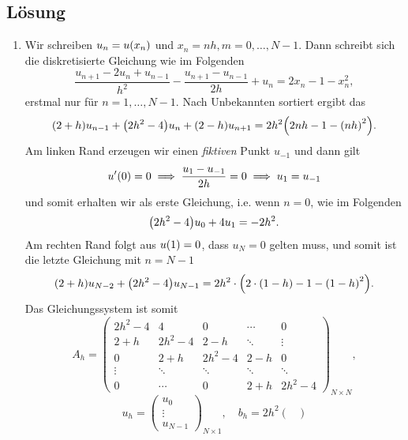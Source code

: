 \documentclass{exercise}
\begin{document}
    \subsection*{Lösung}
    \begin{enumerate}
        \item Wir schreiben \(u_n = u\parentheses*{x_n}\) und \(x_n = nh, m = 0, \ldots, N - 1\).
        Dann schreibt sich die diskretisierte Gleichung wie im Folgenden
        \[
            \frac{u_{n + 1} - 2u_n + u_{n - 1}}{h^2} - \frac{u_{n + 1} - u_{n - 1}}{2h} + u_n = 2x_n - 1 - x_n^2,
        \]
        erstmal nur für \(n = 1, \ldots, N - 1\).
        Nach Unbekannten sortiert ergibt das
        \[
            \parentheses*{2 + h}u_{n - 1} + \parentheses*{2h^2 - 4}u_n + \parentheses*{2 - h}u_{n + 1} = 2h^2 \parentheses*{2nh - 1 - \parentheses*{nh}^2}.
        \]
        Am linken Rand erzeugen wir einen \emph{fiktiven} Punkt \(u_{-1}\) und dann gilt
        \[
            u'\parentheses*{0} = 0 \implies \frac{u_1 - u_{-1}}{2h} = 0 \implies u_1 = u_{-1}
        \]
        und somit erhalten wir als erste Gleichung, i.e. wenn \(n = 0\), wie im Folgenden
        \[
            \parentheses*{2h^2 - 4}u_0 + 4u_1 = -2h^2.
        \]
        Am rechten Rand folgt aus \(u\parentheses*{1} = 0\), dass \(u_N = 0\) gelten muss, und somit ist die letzte Gleichung mit \(n = N - 1\)
        \[
            \parentheses*{2 + h}u_{N - 2} + \parentheses*{2h^2 - 4}u_{N - 1} = 2h^2 \cdot \parentheses*{2 \cdot \parentheses*{1 - h} - 1 - \parentheses*{1 - h}^2}.
        \]
        Das Gleichungssystem ist somit
        \[
            A_h = \begin{pmatrix}
                2h^2 - 4 & 4 & 0 & \cdots & 0\\
                2 + h & 2h^2 - 4 & 2 - h & \ddots & \vdots\\
                0 & 2 + h & 2h^2 - 4 & 2 - h & 0\\
                \vdots & \ddots & \ddots & \ddots & \ddots\\
                0 & \cdots & 0 & 2 + h & 2h^2 - 4
            \end{pmatrix}_{N \times N},
        \]
        \[
            u_h = \begin{pmatrix}
                u_0\\
                \vdots\\
                u_{N - 1}
            \end{pmatrix}_{N \times 1}, \quad b_h = 2h^2 \begin{pmatrix}

\end{pmatrix}\]
\end{enumerate}
\end{document}
